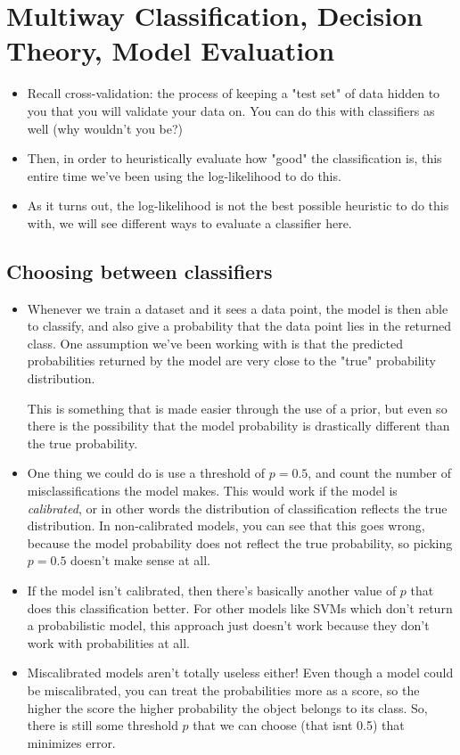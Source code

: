 \section{Multiway Classification, Decision Theory, Model Evaluation}
\begin{itemize}
	\item Recall cross-validation: the process of keeping a "test set" of data hidden
		to you that you will validate your data on. You can do this with classifiers
		as well (why wouldn't you be?)
	\item Then, in order to heuristically evaluate how "good" the classification is,
		this entire time we've been using the log-likelihood to do this. 
	\item As it turns out, the log-likelihood is not the best possible heuristic to
		do this with, we will see different ways to evaluate a classifier here.  
\end{itemize}

\subsection{Choosing between classifiers}
\begin{itemize}
	\item Whenever we train a dataset and it sees a data point, the model is then
		able to classify, and also give a probability that the data point lies in the
		returned class. One assumption we've been working with is that the predicted
		probabilities returned by the model are very close to the "true" probability
		distribution. 

		This is something that is made easier through the use of a prior, but even so
		there is the possibility that the model probability is drastically different
		than the true probability. 
	\item One thing we could do is use a threshold of \( p = 0.5 \), and count the
		number of misclassifications the model makes. This would work if the model is
		\textit{calibrated}, or in other words the distribution of classification
		reflects the true distribution. In non-calibrated models, you can see that
		this goes wrong, because the model probability does not reflect the true
		probability, so picking \( p = 0.5 \) doesn't make sense at all. 
	\item If the model isn't calibrated, then there's basically another value of \( p
		\) that does this classification better. For other models like SVMs which
		don't return a probabilistic model, this approach just doesn't work because
		they don't work with probabilities at all. 
	\item Miscalibrated models aren't totally useless either! Even though a model
		could be miscalibrated, you can treat the probabilities more as a score, so
		the higher the score the higher probability the object belongs to its class.
		So, there is still some threshold \( p \) that we can choose (that isnt 0.5)
		that minimizes error. 
\end{itemize}
